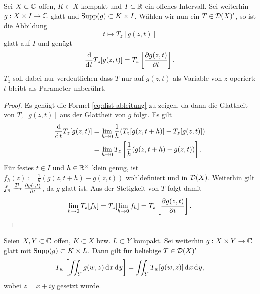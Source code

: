 \begin{lemma}
  \label{lemma:dist-glatt}
  Sei $X \subset \mathbb{C}$ offen, $K \subset X$ kompakt und $I \subset \mathbb{R}$ ein
  offenes Intervall. Sei weiterhin $g: X \times I \rightarrow \mathbb{C}$ glatt und
  $\operatorname{Supp}(g) \subset K \times I$. Wählen wir nun ein $T \in \mathcal{D}(X)'$, so ist die Abbildung
  \[
  t \mapsto T_z[g(z,t)]
  \]
  glatt auf $I$ und genügt
\begin{align}
  \frac{\d}{\d[t]} T_z[g(z,t)] = T_z \left [ \frac{\partial
      g(z,t)}{\partial t} \right ]. \label{eq:dist-ableitung}
  \end{align}
  $T_z$ soll dabei nur verdeutlichen dass $T$ nur auf $g(z,t)$ als
  Variable von $z$ operiert; $t$ bleibt als Parameter unberührt.
\end{lemma}

\begin{proof}
  Es genügt die Formel \eqref{eq:dist-ableitung} zu zeigen, da dann
  die Glattheit von $T_z[g(z,t)]$ aus der Glattheit von $g$ folgt. 
  Es gilt
  \begin{align*}
    \frac{\d}{\d[t]} T_z[g(z,t)] & = \lim_{h \ra 0} \frac1h (
    T_z[g(z,t+h)] - T_z[g(z,t)] ) \\
    & = \lim_{h \ra 0} T_z \left [ \frac1h (g(z,t+h) - g(z,t)) \right ].
  \end{align*}
  Für festes $t \in I$ und $h \in \mathbb{R}^\times$ klein genug, ist $f_h(z)
  := \frac1h ( g(z, t+h) - g(z,t))$ wohldefiniert und in
  $\mathcal{D}(X)$. Weiterhin gilt $f_n \xrightarrow{\mathcal{D}}
  \frac{\partial g(\cdot, t)}{\partial t}$, da $g$ glatt ist. 
  Aus der Stetigkeit von $T$ folgt damit
  \[
  \lim_{h\rightarrow 0} T_z[f_h] = T_z[\lim_{h \rightarrow 0} f_h] = T_z\left[
    \frac{\partial g(z,t)}{\partial t} \right].
  \]
\end{proof}

\begin{lemma}
  \label{lemma:dist-int}
  Seien $X,Y \subset \mathbb{C}$ offen, $K \subset X$ bzw. $L \subset Y$
  kompakt. Sei weiterhin $g: X \times Y \rightarrow \mathbb{C}$ glatt mit $\operatorname{Supp}(g)
  \subset K \times L$. 
  Dann gilt für beliebige $T \in \mathcal{D}(X)'$
  \[
  T_w\left [ \iint_Y g(w,z) \d[x]\d[y] \right ] = \iint_Y T_w [
  g(w,z)] \d[x]\d[y],
  \]
  wobei $z = x + iy$ gesetzt wurde.
\end{lemma}

